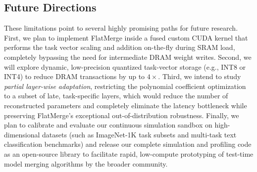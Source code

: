 \subsection{Future Directions}
These limitations point to several highly promising paths for future research. 
First, we plan to implement FlatMerge inside a fused custom CUDA kernel that performs the task vector scaling and addition on-the-fly during SRAM load, completely bypassing the need for intermediate DRAM weight writes. 
Second, we will explore dynamic, low-precision quantized task-vector storage (e.g., INT8 or INT4) to reduce DRAM transactions by up to $4\times$. 
Third, we intend to study \emph{partial layer-wise adaptation}, restricting the polynomial coefficient optimization to a subset of late, task-specific layers, which would reduce the number of reconstructed parameters and completely eliminate the latency bottleneck while preserving FlatMerge's exceptional out-of-distribution robustness.
Finally, we plan to calibrate and evaluate our continuous simulation sandbox on high-dimensional datasets (such as ImageNet-1K task subsets and multi-task text classification benchmarks) and release our complete simulation and profiling code as an open-source library to facilitate rapid, low-compute prototyping of test-time model merging algorithms by the broader community.
